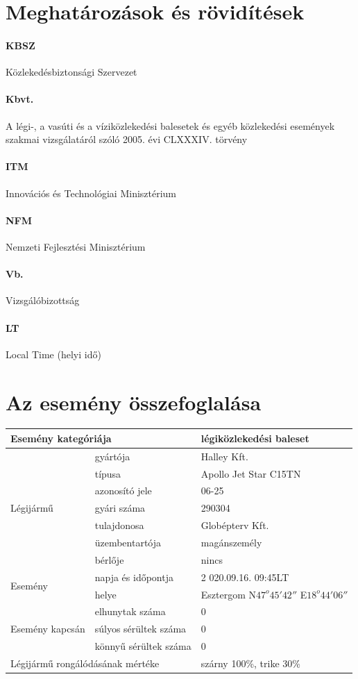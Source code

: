 \documentclass[a4paper,10pt]{article}
\begin{document}
\section*{Meghatározások és rövidítések}
\paragraph*{KBSZ} Közlekedésbiztonsági Szervezet
\paragraph*{Kbvt.} A légi-, a vasúti és a víziközlekedési balesetek és egyéb 
közlekedési események szakmai vizsgálatáról szóló 2005. évi CLXXXIV. 
törvény
\paragraph*{ITM} Innovációs és Technológiai Minisztérium
\paragraph*{NFM} Nemzeti Fejlesztési Minisztérium
\paragraph*{Vb.} Vizsgálóbizottság
\paragraph*{LT} Local Time (helyi idő)
\pagebreak

\section*{Az esemény összefoglalása}
\begin{tabular}{|l|l|l|}
\hline
\multicolumn{2}{|l|}{Esemény kategóriája} & légiközlekedési baleset\\ \hline
\multirow{7}{3cm}{Légijármű}
    & gyártója & Halley Kft.\\ \cline{2-3}
    & típusa & Apollo Jet Star C15TN\\ \cline{2-3}
    & azonosító jele & 06-25\\ \cline{2-3}
    & gyári száma & 290304\\ \cline{2-3}
    & tulajdonosa & Globépterv Kft.\\ \cline{2-3}
    & üzembentartója & magánszemély\\ \cline{2-3}
    & bérlője & nincs\\ \cline{2-3}
\hline
\multirow{2}{3cm}{Esemény}
    & napja és időpontja &2 020.09.16. 09:45LT\\ \cline{2-3}
    & helye & Esztergom N$47^o 45' 42''$ E$18^o 44' 06''$\\ \cline{2-3}
\hline
\multirow{3}{3cm}{Esemény kapcsán}
    & elhunytak száma & 0\\ \cline{2-3}
    & súlyos sérültek száma & 0\\ \cline{2-3}
    & könnyű sérültek száma & 0\\ \cline{2-3}
\hline
\multicolumn{2}{|l|}{Légijármű rongálódásának mértéke} & szárny 100\%, trike 
30\%\\ \hline
\end{tabular}
\end{document}

